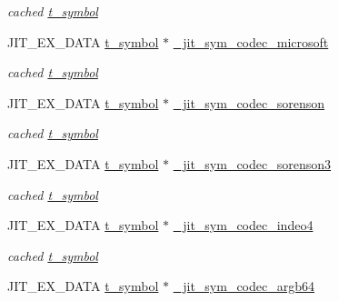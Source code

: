 \begin{DoxyCompactItemize}
\begin{DoxyCompactList}\small\item\em cached \hyperlink{structt__symbol}{t\_\-symbol} \item\end{DoxyCompactList}\item 
\hypertarget{group__jitter_ga838ed71ec474474595766d315e13426a}{
JIT\_\-EX\_\-DATA \hyperlink{structt__symbol}{t\_\-symbol} $\ast$ \hyperlink{group__jitter_ga838ed71ec474474595766d315e13426a}{\_\-jit\_\-sym\_\-codec\_\-microsoft}}
\label{group__jitter_ga838ed71ec474474595766d315e13426a}

\begin{DoxyCompactList}\small\item\em cached \hyperlink{structt__symbol}{t\_\-symbol} \item\end{DoxyCompactList}\item 
\hypertarget{group__jitter_ga87cfbc2cb0d6a4718327a5413049c941}{
JIT\_\-EX\_\-DATA \hyperlink{structt__symbol}{t\_\-symbol} $\ast$ \hyperlink{group__jitter_ga87cfbc2cb0d6a4718327a5413049c941}{\_\-jit\_\-sym\_\-codec\_\-sorenson}}
\label{group__jitter_ga87cfbc2cb0d6a4718327a5413049c941}

\begin{DoxyCompactList}\small\item\em cached \hyperlink{structt__symbol}{t\_\-symbol} \item\end{DoxyCompactList}\item 
\hypertarget{group__jitter_gae08e987d18fabc4404382feb4d0136ce}{
JIT\_\-EX\_\-DATA \hyperlink{structt__symbol}{t\_\-symbol} $\ast$ \hyperlink{group__jitter_gae08e987d18fabc4404382feb4d0136ce}{\_\-jit\_\-sym\_\-codec\_\-sorenson3}}
\label{group__jitter_gae08e987d18fabc4404382feb4d0136ce}

\begin{DoxyCompactList}\small\item\em cached \hyperlink{structt__symbol}{t\_\-symbol} \item\end{DoxyCompactList}\item 
\hypertarget{group__jitter_ga35c5b015f1e2a0d64d9a824e57cab296}{
JIT\_\-EX\_\-DATA \hyperlink{structt__symbol}{t\_\-symbol} $\ast$ \hyperlink{group__jitter_ga35c5b015f1e2a0d64d9a824e57cab296}{\_\-jit\_\-sym\_\-codec\_\-indeo4}}
\label{group__jitter_ga35c5b015f1e2a0d64d9a824e57cab296}

\begin{DoxyCompactList}\small\item\em cached \hyperlink{structt__symbol}{t\_\-symbol} \item\end{DoxyCompactList}\item 
\hypertarget{group__jitter_ga153a2119b188f28cb55a5dfbd48d5a26}{
JIT\_\-EX\_\-DATA \hyperlink{structt__symbol}{t\_\-symbol} $\ast$ \hyperlink{group__jitter_ga153a2119b188f28cb55a5dfbd48d5a26}{\_\-jit\_\-sym\_\-codec\_\-argb64}}
\label{group__jitter_ga153a2119b188f28cb55a5dfbd48d5a26}


\end{DoxyCompactItemize}
